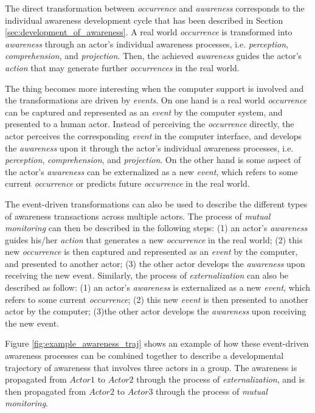 The direct transformation between \emph{occurrence} and \emph{awareness} corresponds to the individual awareness development cycle that has been described in Section \ref{sec:development_of_awareness}. A real world \emph{occurrence} is transformed into \emph{awareness} through an actor's individual awareness processes, i.e. \emph{perception}, \emph{comprehension}, and \emph{projection}. Then, the achieved \emph{awareness} guides the actor's \emph{action} that may generate further \emph{occurrences} in the real world. 

The thing becomes more interesting when the computer support is involved and the transformations are driven by \emph{events}. On one hand is a real world \emph{occurrence} can be captured and represented as an \emph{event} by the computer system, and presented to a human actor. Instead of perceiving the \emph{occurrence} directly, the actor perceives the corresponding \emph{event} in the computer interface, and develops the \emph{awareness} upon it through the actor's individual awareness processes, i.e. \emph{perception}, \emph{comprehension}, and \emph{projection}. On the other hand is some aspect of the actor's \emph{awareness} can be externalized as a new \emph{event}, which refers to some current \emph{occurrence} or predicts future \emph{occurrence} in the real world.

The event-driven transformations can also be used to describe the different types of awareness transactions across multiple actors. The process of \emph{mutual monitoring} can then be described in the following steps: (1) an actor's \emph{awareness} guides his/her \emph{action} that generates a new \emph{occurrence} in the real world; (2) this new \emph{occurrence} is then captured and represented as an \emph{event} by the computer, and presented to another actor; (3) the other actor develops the \emph{awareness} upon receiving the new event. Similarly, the process of \emph{externalization} can also be described as follow: (1) an actor's \emph{awareness} is externalized as a new \emph{event}, which refers to some current \emph{occurrence}; (2) this new \emph{event} is then presented to another actor by the computer; (3)the other actor develops the \emph{awareness} upon receiving the new event. 

Figure \ref{fig:example_awareness_traj} shows an example of how these event-driven awareness processes can be combined together to describe a developmental trajectory of awareness that involves three actors in a group. The awareness is propagated from $Actor1$ to $Actor2$ through the process of \emph{externalization}, and is then propagated from $Actor2$ to $Actor3$ through the process of \emph{mutual monitoring}.

